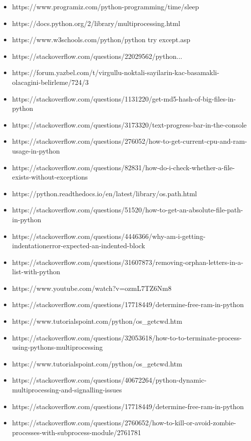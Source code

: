 \documentclass[onecolumn]{article}
\begin{document}
\begin{itemize}
\item https://www.programiz.com/python-programming/time/sleep
\item https://docs.python.org/2/library/multiprocessing.html
\item https://www.w3schools.com/python/python try except.asp
\item https://stackoverflow.com/questions/22029562/python...
\item https://forum.yazbel.com/t/virgullu-noktali-sayilarin-kac-basamakli-olacagini-belirleme/724/3
\item https://stackoverflow.com/questions/1131220/get-md5-hash-of-big-files-in-python
\item https://stackoverflow.com/questions/3173320/text-progress-bar-in-the-console
\item https://stackoverflow.com/questions/276052/how-to-get-current-cpu-and-ram-usage-in-python
\item https://stackoverflow.com/questions/82831/how-do-i-check-whether-a-file-exists-without-exceptions
\item https://python.readthedocs.io/en/latest/library/os.path.html
\item https://stackoverflow.com/questions/51520/how-to-get-an-absolute-file-path-in-python
\item https://stackoverflow.com/questions/4446366/why-am-i-getting-indentationerror-expected-an-indented-block
\item https://stackoverflow.com/questions/31607873/removing-orphan-letters-in-a-list-with-python
\item https://www.youtube.com/watch?v=ozmL7TZ6Nm8
\item https://stackoverflow.com/questions/17718449/determine-free-ram-in-python
\item https://www.tutorialspoint.com/python/os_getcwd.htm
\item https://stackoverflow.com/questions/32053618/how-to-to-terminate-process-using-pythons-multiprocessing
\item https://www.tutorialspoint.com/python/os_getcwd.htm
\item https://stackoverflow.com/questions/40672264/python-dynamic-multiprocessing-and-signalling-issues
\item https://stackoverflow.com/questions/17718449/determine-free-ram-in-python
\item https://stackoverflow.com/questions/2760652/how-to-kill-or-avoid-zombie-processes-with-subprocess-module/2761781

\end{itemize}
\end{document}
